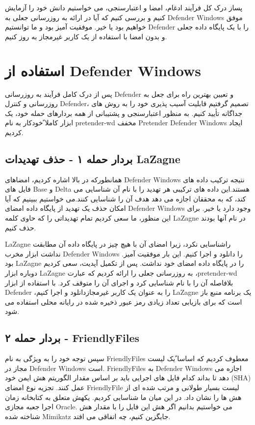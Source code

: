 \documentclass{ISCISC2020}
\begin{document}
پساز درک کل فرآیند ادغام، امضا و اعتبارسنجی، می خواستیم دانش خود را آزمایش کنیم و بررسی کنیم که آیا در 
ارائه به روزرسانی جعلی به Defender Windows موفق خواهیم بود یا خیر. موفقیت آمیز بود و ما توانستیم 
Defender را با یک پایگاه داده جعلی و بدون امضا با استفاده از یک کاربر غیرمجاز به روز کنیم.



\section{استفاده از Defender Windows}
پس از درک کامل فرآیند به روزرسانی Defender و تعیین بهترین راه برای جعل به روزرسانی و کنترل Defender، 
تصمیم گرفتیم قابلیت آسیب پذیری خود را به روش های جداگانه تأیید کنیم. به منظور اعتبارسنجی و پشتیبانی از همه 
بردارهای حمله خود، یک ابزار کاملا ًخودکار به نام pretender-wd مخفف Pretender Defender Windows ایجاد 
کردیم.

\subsection{بردار حمله ۱ - حذف تهدیدات LaZagne}
همانطورکه در بالا اشاره کردیم، امضاهای Defender Windows نتیجه ترکیب داده های فایل های Base و Delta
هستند.این داده های ترکیبی هر تهدید را با نام آن شناسایی می کند، که به محققان اجازه می دهد هدف آن را شناسایی 
کنند.می خواستیم ببینیم که آیا امکان حذف یک تهدید از پایگاه داده امضای Defender Windows وجود دارد یا خیر. 
برای این منظور، ما سعی کردیم تمام تهدیداتی را که حاوی کلمه LaZagne در نام آنها بودند حذف کنیم.


LaZagne راشناسایی نکرد، زیرا امضای آن با هیچ چیز در پایگاه داده آن مطابقت نداشت ابزار مخرب Defender
Windows .را دانلود و اجرا کنیم. این بار موفقیت آمیز بود LaZagne را در پایگاه داده امضای خود نداشت. پس از 
تکمیل آپدیت، سعی کردیم دوباره ابزار LaZagne به روزرسانی جعلی را ارائه کردیم که عبارت ،pretender-wd
بلافاصله آن را با نام شناسایی کرد و اجرای آن را متوقف کرد. با استفاده از ابزار Defender ،را به عنوان یک کاربر 
غیرمجازدانلود و اجرا کنیم LaZagne یک برنامه منبع باز است که برای بازیابی تعداد زیادی رمز عبور ذخیره شده در 
رایانه محلی استفاده می شود.

\subsection{بردار حمله ۲ - FriendlyFiles}
سپس توجه خود را به ویژگی به نام FriendlyFiles معطوف کردیم که اساسا ًیک لیست مجاز در Defender
Windows است. FriendlyFiles به Defender Windows اجازه می دهد تا بداند کدام فایل های اجرایی باید بر 
اساس مقدار الگوریتم هش ایمن خود (SHA) عمل کنند. تجزیه نوع امضای FriendlyFile لیست بسیار طولانی و 
مرتب شده ای از هش ها را نشان داد. در این میان ما شناسایی کردیم. یکهش متعلق به کتابخانه زمان اجرا جعبه مجازی Oracle. می خواستیم بدانیم اگر هش این فایل را با مقدار هش 
شناخته شده Mimikatz جایگزین کنیم، چه اتفاقی می افتد.
\end{document}
